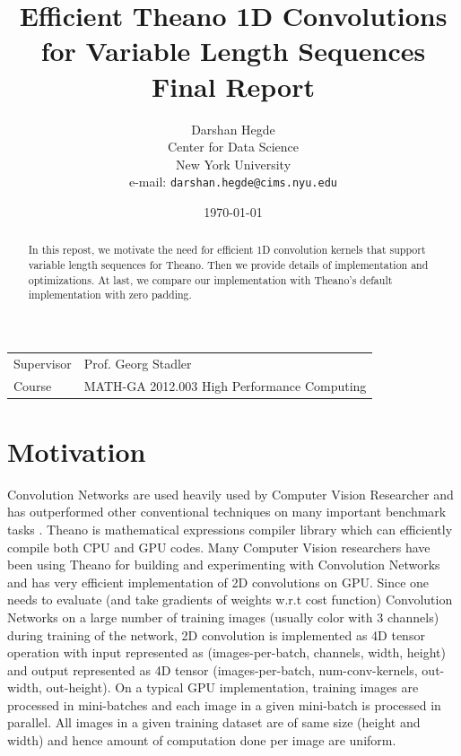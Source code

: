 \documentclass{article}
\author{Darshan Hegde \\
Center for Data Science \\
New York University \\
e-mail: \texttt{darshan.hegde@cims.nyu.edu}
}
\title{\textbf{Efficient Theano 1D Convolutions for Variable Length Sequences} \\
 Final Report
}
\date{\today}
\begin{document}
\maketitle

\begin{table}[!th]
\begin{tabular}{l p{}}
Supervisor & Prof. Georg Stadler \\
Course &  MATH-GA 2012.003 High Performance Computing \\
\end{tabular}
\end{table}

\begin{abstract}
In this repost, we motivate the need for efficient 1D convolution kernels that support variable length sequences for Theano. Then we provide details of implementation and optimizations. At last, we compare our implementation with Theano's default implementation with zero padding.   
\end{abstract}

\section*{Motivation}
Convolution Networks are used heavily used by Computer Vision Researcher and has outperformed other conventional techniques on many important benchmark tasks \cite{ImageNet}. Theano \cite{Theano-2012} \cite{bergstra+al:2010-scipy} is mathematical expressions compiler library which can efficiently compile both CPU and GPU codes. Many Computer Vision researchers have been using Theano \cite{Theano-2012} \cite{bergstra+al:2010-scipy} for building and experimenting with Convolution Networks and has very efficient implementation of 2D convolutions on GPU. Since one needs to evaluate (and take gradients of weights w.r.t cost function) Convolution Networks on a large number of training images (usually color with 3 channels) during training of the network, 2D convolution is implemented as 4D tensor operation with input represented as (images-per-batch, channels, width, height) and output represented as 4D tensor (images-per-batch, num-conv-kernels, out-width, out-height). On a typical GPU implementation, training images are processed in mini-batches and each image in a given mini-batch is processed in parallel. All images in a given training dataset are of same size (height and width) and hence amount of computation done per image are uniform.
\end{document}
